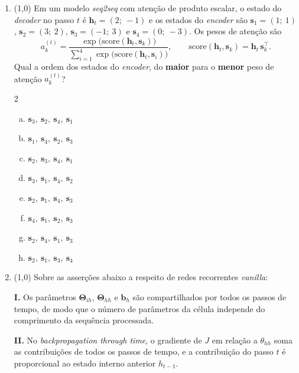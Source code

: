 \documentclass[11pt,a4paper]{article}
\begin{document}
\begin{enumerate}[1)]
\item (1{,}0) Em um modelo \textit{seq2seq} com atenção de produto escalar, o estado do \textit{decoder} no passo $t$ é $\mathbf{h}_t = (2;\ {-}1)$ e os estados do \textit{encoder} são $\mathbf{s}_1 = (1;\ 1)$, $\mathbf{s}_2 = (3;\ 2)$, $\mathbf{s}_3 = ({-}1;\ 3)$ e $\mathbf{s}_4 = (0;\ {-}3)$. Os pesos de atenção são
\[
a_k^{(t)} = \frac{\exp\bigl(\mathrm{score}(\mathbf{h}_t, \mathbf{s}_k)\bigr)}{\sum_{i=1}^{4}\exp\bigl(\mathrm{score}(\mathbf{h}_t, \mathbf{s}_i)\bigr)}, \qquad \mathrm{score}(\mathbf{h}_t, \mathbf{s}_k) = \mathbf{h}_t\,\mathbf{s}_k^{\top}.
\]
Qual a ordem dos estados do \textit{encoder}, do \textbf{maior} para o \textbf{menor} peso de atenção $a_k^{(t)}$?
\begin{multicols}{2}
\begin{enumerate}[a)]
    \item $\mathbf{s}_3,\ \mathbf{s}_2,\ \mathbf{s}_4,\ \mathbf{s}_1$
    \item $\mathbf{s}_1,\ \mathbf{s}_4,\ \mathbf{s}_2,\ \mathbf{s}_3$
    \item $\mathbf{s}_2,\ \mathbf{s}_3,\ \mathbf{s}_4,\ \mathbf{s}_1$
    \item $\mathbf{s}_3,\ \mathbf{s}_1,\ \mathbf{s}_4,\ \mathbf{s}_2$
    \item $\mathbf{s}_2,\ \mathbf{s}_1,\ \mathbf{s}_4,\ \mathbf{s}_3$
    \item $\mathbf{s}_4,\ \mathbf{s}_1,\ \mathbf{s}_2,\ \mathbf{s}_3$
    \item $\mathbf{s}_2,\ \mathbf{s}_4,\ \mathbf{s}_1,\ \mathbf{s}_3$
    \item $\mathbf{s}_2,\ \mathbf{s}_1,\ \mathbf{s}_3,\ \mathbf{s}_4$
\end{enumerate}
\end{multicols}

\pagebreak
\item (1{,}0) Sobre as asserções abaixo a respeito de redes recorrentes \textit{vanilla}:

\textbf{I.} Os parâmetros $\mathbf{\Theta}_{ih}$, $\mathbf{\Theta}_{hh}$ e $\mathbf{b}_h$ são compartilhados por todos os passos de tempo, de modo que o número de parâmetros da célula independe do comprimento da sequência processada.

\textbf{II.} No \textit{backpropagation through time}, o gradiente de $J$ em relação a $\theta_{hh}$ soma as contribuições de todos os passos de tempo, e a contribuição do passo $t$ é proporcional ao estado interno anterior $h_{t-1}$.


\end{enumerate}
\end{document}
